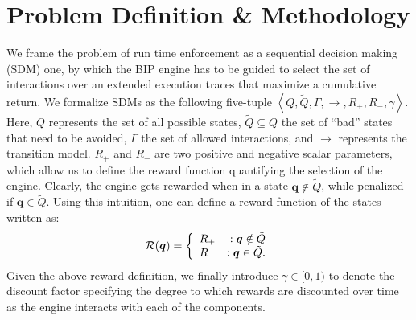 \section{Problem Definition \& Methodology}
\label{sec:rerl}
We frame the problem of run time enforcement as a sequential decision making (SDM) one, by which the BIP engine has to be guided to select the set of interactions over an extended execution traces that maximize a cumulative return.  We formalize SDMs as the following five-tuple $\left \langle Q, \tilde{Q},\Gamma, \rightarrow, {R}_{+}, {R}_{-}, \gamma \right\rangle$.  Here, $Q$ represents the set of all possible states, $\tilde{Q} \subseteq Q$ the set of ``bad'' states that need to be avoided, $\Gamma$ the set of allowed interactions, and $\rightarrow$ represents the transition model. $R_{+}$ and ${R}_{-}$ are two positive and negative scalar parameters, which allow us to define the reward function quantifying the selection of the engine.
Clearly, the engine gets rewarded when in a state $ \bm{q} \notin \tilde{Q}$, while penalized if $ \bm{q} \in \tilde{Q}$. Using this intuition, one can define a reward function of the states written as: 
\vspace*{-0.4cm}
%
\begin{displaymath}
   \mathcal{R}( \bm{q}) = \left\{
     \begin{array}{lr}
       R_{+} & :   \bm{q} \notin \tilde{Q} \\
       R_{-} & :  \bm{q} \in \tilde{Q}.
     \end{array}
   \right.
   \vspace*{-0.4cm}
\end{displaymath} 
Given the above reward definition, we finally introduce $\gamma \in [0,1)$ to denote the discount factor specifying the degree to which rewards are discounted over time as the engine interacts with each of the components. 

